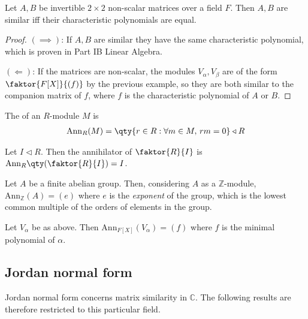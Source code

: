 \begin{corollary} \label{cor:16.9}
	Let $A, B$ be invertible $2 \times 2$ non-scalar matrices over a field $F$.
	Then $A, B$ are similar iff their characteristic polynomials are equal.
\end{corollary}

\begin{proof}
	$(\implies)$: If $A, B$ are similar they have the same characteristic polynomial, which is proven in Part IB Linear Algebra.

	$(\Longleftarrow)$: If the matrices are non-scalar, the modules $V_\alpha, V_\beta$ are of the form $\faktor{F[X]}{(f)}$ by the previous example, so they are both similar to the companion matrix of $f$, where $f$ is the characteristic polynomial of $A$ or $B$.
\end{proof}

\begin{definition}[Annihilator]
	The  of an $R$-module $M$ is
	\begin{align*}
		\mathrm{Ann}_R(M) = \qty{r \in R : \forall m \in M,\, rm = 0} \triangleleft R
	\end{align*}
\end{definition}

\begin{example}
	Let $I \triangleleft R$.
	Then the annihilator of $\faktor{R}{I}$ is $\mathrm{Ann}_R\qty(\faktor{R}{I}) = I$.
\end{example} 

\begin{example}
	Let $A$ be a finite abelian group.
	Then, considering $A$ as a $\mathbb Z$-module, $\mathrm{Ann}_{\mathbb Z}(A) = (e)$ where $e$ is the \textit{exponent} of the group, which is the lowest common multiple of the orders of elements in the group.
\end{example}

\begin{example}
	Let $V_\alpha$ be as above.
	Then $\mathrm{Ann}_{F[X]}(V_\alpha) = (f)$ where $f$ is the minimal polynomial of $\alpha$.
\end{example} 

\subsection{Jordan normal form}
Jordan normal form concerns matrix similarity in $\mathbb C$.
The following results are therefore restricted to this particular field.

